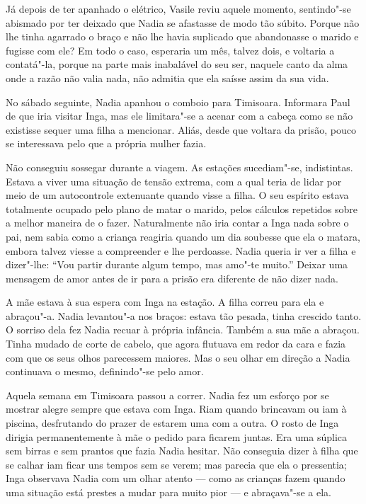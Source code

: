 Já depois de ter apanhado o elétrico, Vasile reviu aquele momento,
sentindo"-se abismado por ter deixado que Nadia se afastasse de modo tão
súbito. Porque não lhe tinha agarrado o braço e não lhe havia suplicado
que abandonasse o marido e fugisse com ele? Em todo o caso, esperaria um
mês, talvez dois, e voltaria a contatá"-la,
porque na parte mais inabalável do seu ser, naquele canto da alma onde a
razão não valia nada, não admitia que ela saísse assim da sua vida.

\bigskip

No sábado seguinte, Nadia apanhou o comboio para Timisoara. Informara
Paul de que iria visitar Inga, mas ele limitara"-se a acenar com a cabeça
como se não existisse sequer uma filha a mencionar. Aliás, desde que
voltara da prisão, pouco se interessava pelo que a própria mulher fazia.

Não conseguiu sossegar durante a viagem. As estações sucediam"-se,
indistintas. Estava a viver uma situação de tensão extrema, com a qual
teria de lidar por meio de um autocontrole extenuante quando visse a
filha. O seu espírito estava totalmente ocupado pelo plano de matar o
marido, pelos cálculos repetidos sobre a melhor maneira de o fazer.
Naturalmente não iria contar a Inga nada sobre o pai, nem sabia como a
criança reagiria quando um dia soubesse que ela o matara, embora talvez
viesse a compreender e lhe perdoasse. Nadia queria ir ver a filha e
dizer"-lhe: ``Vou partir durante algum tempo, mas amo"-te muito.'' Deixar
uma mensagem de amor antes de ir para a
prisão era diferente de não dizer nada.

A mãe estava à sua espera com Inga na estação. A filha correu para ela e
abraçou"-a. Nadia levantou"-a nos braços: estava tão pesada, tinha
crescido tanto. O sorriso dela fez Nadia recuar à própria infância.
Também a sua mãe a abraçou. Tinha mudado de corte de cabelo, que agora
flutuava em redor da cara e fazia com que os seus olhos parecessem
maiores. Mas o seu olhar em direção a Nadia continuava o mesmo,
definindo"-se pelo amor.

Aquela semana em Timisoara passou a correr. Nadia fez um esforço por se
mostrar alegre sempre que estava com Inga. Riam quando brincavam ou iam
à piscina, desfrutando do prazer de estarem uma com a outra. O rosto
de Inga dirigia permanentemente à mãe o pedido para ficarem juntas.
Era uma súplica sem birras e sem prantos que fazia Nadia hesitar. Não
conseguia dizer à filha que se calhar iam ficar uns tempos sem se verem;
mas parecia que ela o pressentia; Inga observava Nadia com um olhar
atento --- como as crianças fazem quando uma situação está prestes a
mudar para muito pior --- e abraçava"-se a ela.


